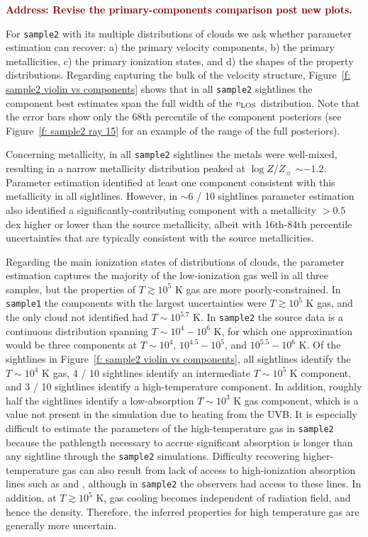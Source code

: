 \documentclass[fleqn,usenatbib]{mnras}
\newcommand{\todo}[1]{\textcolor{Maroon}{\textbf{Address: #1}}}
\newcommand{\metallicity}{$\log Z/Z_{\sun}$}
\begin{document}
\todo{Revise the primary-components comparison post new plots.}

For \texttt{sample2} with its multiple distributions of clouds we ask whether parameter estimation can recover:
a) the primary velocity components,
b) the primary metallicities,
c) the primary ionization states, and
d) the shapes of the property distributions.
Regarding capturing the bulk of the velocity structure, Figure~\ref{f: sample2 violin vs components} shows that in all \texttt{sample2} sightlines the component best estimates span the full width of the $v_{\rm LOS}$ distribution.
Note that the error bars show only the 68th percentile of the component posteriors (see Figure~\ref{f: sample2 ray 15} for an example of the range of the full posteriors).

Concerning metallicity, in all \texttt{sample2} sightlines the metals were well-mixed, resulting in a narrow metallicity distribution peaked at {\metallicity} $\sim -1.2$.
Parameter estimation identified at least one component consistent with this metallicity in all sightlines.
However, in $\sim 6$ / 10 sightlines parameter estimation also identified a significantly-contributing component with a metallicity $>0.5$ dex higher or lower than the source metallicity,
albeit with 16th-84th percentile uncertainties that are typically consistent with the source metallicities.

Regarding the main ionization states of distributions of clouds,
the parameter estimation captures the majority of the low-ionization gas well in all three samples, but the properties of $T \gtrsim 10^5$ K gas are more poorly-constrained.
In \texttt{sample1} the components with the largest uncertainties were $T \gtrsim 10^5$ K gas,
and the only cloud not identified had $T \sim 10^{5.7}$ K.
In \texttt{sample2} the source data is a continuous distribution spanning $T \sim 10^4 - 10^6$ K,
for which one approximation would be three components at $T\sim 10^4$, $10^{4.5}-10^5$, and $10^{5.5}-10^6$ K.
Of the sightlines in Figure~\ref{f: sample2 violin vs components}, 
all sightlines identify the $T \sim 10^4$ K gas,
4 / 10 sightlines identify an intermediate $T \sim 10^5$ K component,
and 3 / 10 sightlines identify a high-temperature component.
In addition, roughly half the sightlines identify a low-absorption $T \sim 10^3$ K gas component, which is a value not present in the simulation due to heating from the UVB.
It is especially difficult to estimate the parameters of the high-temperature gas in \texttt{sample2} because the pathlength necessary to accrue significant absorption is longer than any sightline through the \texttt{sample2} simulations.
Difficulty recovering higher-temperature gas can also result from lack of access to high-ionization absorption lines such as  and ,
although in \texttt{sample2} the observers had access to these lines.
In addition, at $T \gtrsim 10^5$ K, gas cooling becomes independent of radiation field, and hence the density. 
Therefore, the inferred properties for high temperature gas are generally more uncertain.
\end{document}
